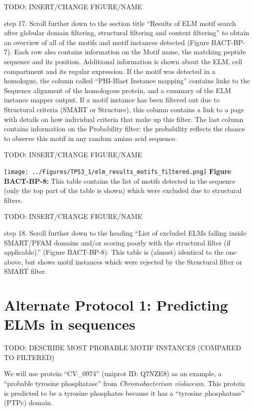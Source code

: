 TODO: INSERT/CHANGE FIGURE/NAME

step 17. Scroll further down to the section title ``Results of ELM motif
search after globular domain filtering, structural filtering and context
filtering'' to obtain an overview of all of the motifs and motif
instances detected (Figure BACT-BP-7). Each row also contains
information on the Motif name, the matching peptide sequence and its
position. Additional information is shown about the ELM, cell
compartment and its regular expression. If the motif was detected in a
homologue, the column called ``PHI-Blast Instance mapping'' contains
links to the Sequence alignment of the homologous protein, and a summary
of the ELM instance mapper output. If a motif instance has been filtered
out due to Structural criteria (SMART or Structure), this column
contains a link to a page with details on how individual criteria that
make up this filter. The last column contains information on the
Probability filter: the probability reflects the chance to observe this
motif in any random amino acid sequence.

TODO: INSERT/CHANGE FIGURE/NAME

\texttt{[image: ../Figures/TP53\_1/elm\_results\_motifs\_filtered.png]}
\textbf{Figure BACT-BP-8:} This table contains the list of motifs
detected in the sequence (only the top part of the table is shown) which
were excluded due to structural filters.

TODO: INSERT/CHANGE FIGURE/NAME

step 18. Scroll further down to the heading ``List of excluded ELMs
falling inside SMART/PFAM domains and/or scoring poorly with the
structural filter (if applicable).'' (Figure BACT-BP-8). This table is
(almost) identical to the one above, but shows motif instances which
were rejected by the Structural filter or SMART filter.

\section{Alternate Protocol 1: Predicting ELMs in
sequences}\label{alternate-protocol-1-predicting-elms-in-sequences}

TODO: DESCRIBE MOST PROBABLE MOTIF INSTANCES (COMPARED TO FILTERED)

We will use protein ``CV\_0974'' (uniprot ID: Q7NZE8) as an example, a
``probable tyrosine phosphatase'' from \emph{Chromobacterium violaceum}.
This protein is predicted to be a tyrosine phosphates because it has a
``tyrosine phosphatase'' (PTPc) domain.

